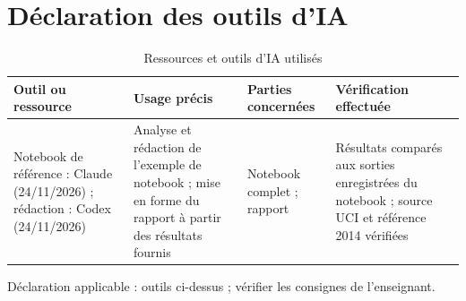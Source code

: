 \documentclass[11pt,a4paper]{article}
\begin{document}
\section{Déclaration des outils d'IA}
\label{ann:ia}
\begin{table}[htbp]
  \centering
  \caption{Ressources et outils d'IA utilisés}
  \label{tab:ia}
  \small
  \begin{tabular}{@{}P{3cm} P{4.8cm} P{3.3cm} P{4.4cm}@{}}
    \toprule
    Outil ou ressource & Usage précis & Parties concernées & Vérification effectuée \\
    \midrule
    Notebook de référence : Claude (24/11/2026) ; rédaction : Codex (24/11/2026) & Analyse et rédaction de l'exemple de notebook ; mise en forme du rapport à partir des résultats fournis & Notebook complet ; rapport & Résultats comparés aux sorties enregistrées du notebook ; source UCI et référence 2014 vérifiées \\
    \bottomrule
  \end{tabular}
\end{table}
Déclaration applicable : outils ci-dessus ; vérifier les consignes de l'enseignant.
\end{document}

